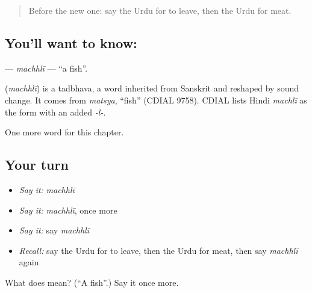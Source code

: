 \label{lesson:UR-C53-machhli}



\begin{quote}
Before the new one: say the Urdu for to leave, then the Urdu for meat.
\end{quote}

\subsection*{You'll want to know: }
\textbf{} — \emph{machhlī} — \textquotedblleft{}a fish\textquotedblright{}.

\begin{cousinweb}
\textbf{} (\emph{machhlī}) is a tadbhava, a word inherited from Sanskrit and reshaped by sound change. It comes from \emph{matsya}, \textquotedblleft{}fish\textquotedblright{} (CDIAL 9758). CDIAL lists Hindi \emph{machlī} as the form with an added \emph{-l-}.
\end{cousinweb}

\begin{grammarlens}[title={What you've built}]
One more word for this chapter.
\end{grammarlens}

\subsection*{Your turn}
\begin{itemize}
\raggedright
  \item \emph{Say it:} \emph{machhlī}
  \item \emph{Say it:} \emph{machhlī}, once more
  \item \emph{Say it:} say \emph{machhlī}
  \item \emph{Recall:} say the Urdu for to leave, then the Urdu for meat, then say \emph{machhlī} again
\end{itemize}

\begin{tcolorbox}[breakable,colback=teal!4,colframe=teal!35!black,title={Before you move on}]
What does  mean? (\textquotedblleft{}A fish\textquotedblright{}.) Say it once more.
\end{tcolorbox}
